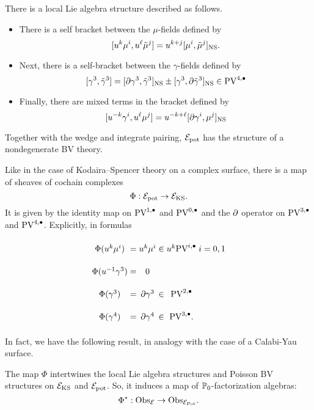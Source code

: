 \documentclass[11pt]{article}
\newcommand{\surya}[1]{(\textcolor{red}{Surya: #1})}
\newcommand\bu{\bullet}
\begin{document}
There is a local Lie algebra structure described as follows.
\begin{itemize}
\item 
There is a self bracket between the $\mu$-fields defined by
\[
[u^k \mu^i, u^\ell \Tilde{\mu}^j] = u^{k+j} [\mu^i, \Tilde{\mu}^j]_{\rm NS} .
\]
\item Next, there is a self-bracket between the $\gamma$-fields defined by 
\[
[\gamma^3, \Tilde{\gamma}^3] = [\partial \gamma^3 , \Tilde{\gamma}^{3}]_{\rm NS} \pm [\gamma^3, \partial \Tilde{\gamma}^{3}]_{\rm NS} \in {\rm PV}^{4,\bu} 
\]
\item Finally, there are mixed terms in the bracket defined by
\[
[u^{-k} \gamma^i , u^\ell \mu^j] = u^{-k + \ell} [\partial \gamma^i, \mu^j]_{\rm NS}
\]
\end{itemize}

Together with the wedge and integrate pairing, $\mathcal{E}_{\rm pot}$ has the structure of a nondegenerate BV theory.

Like in the case of Kodaira--Spencer theory on a complex surface, there is a  map of sheaves of cochain complexes 
\[
\Phi: \mathcal{E}_{\rm pot}\to \mathcal{E}_{\rm KS} .
\] 
It is given by the identity map on $\PV^{1,\bu}$ and $\PV^{0,\bu}$ and the $\partial$ operator on $\PV^{3,\bu}$ and $\PV^{4,\bu}$. 
Explicitly, in formulas
\[
\arraycolsep=1.4pt\def\arraystretch{2.2}
\begin{array}{ccccccccc}
\Phi(u^k \mu^{i}) & = & u^k \mu^i & \in & u^k \PV^{i, \bu} & i = 0,1 \\
\Phi(u^{-1} \gamma^3) & = & 0 \\
\Phi(\gamma^3) & = & \partial \gamma^3 & \in & \PV^{2,\bu} \\
\Phi(\gamma^4) & = & \partial \gamma^4 & \in & \PV^{3,\bu} .
\end{array} 
\]


In fact, we have the following result, in analogy with the case of a Calabi-Yau surface.

\begin{prop}
The map $\Phi$ intertwines the local Lie algebra structures and Poisson BV structures on $\mathcal{E}_{\rm KS}$ and $\mathcal{E}_{\rm pot}$. 
So, it induces a map of $\mathbb{P}_0$-factorization algebras:
\[
\Phi^* : {\rm Obs}_{\mathcal{E}} \to {\rm Obs}_{\mathcal{E}_{\rm Pot}} .
\]
\end{prop} 
\end{document}

